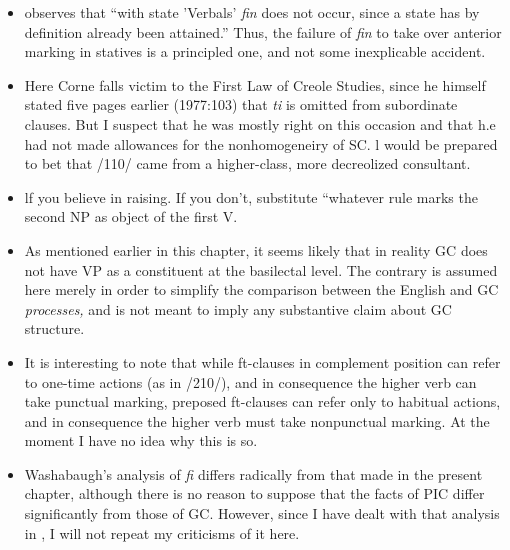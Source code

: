 \begin{itemize}
\begin{itemize}
\begin{itemize}
\begin{itemize}
\begin{itemize}
\begin{itemize}
\begin{itemize}
\item \citet{Corne1981} observes that ``with state 'Verbals' \textit{fin} does not occur, since a state has by definition already been attained.'' Thus, the failure of \textit{fin} to take over anterior marking in statives is a principled one, and not some inexplicable accident.
\item Here Corne falls victim to the First Law of Creole Studies, since he himself stated five pages earlier (1977:103) that \textit{ti} is omitted from subordinate clauses. But I suspect that he was mostly right on this occasion and that h.e had not made allowances for the nonhomogeneiry of SC. l would be prepared to bet that /110/ came from a higher-class, more decreolized consultant.
\item lf you believe in raising. If you don't, substitute ``whatever rule marks the second NP as object of the first V.{\textquotedbl}
\item As mentioned earlier in this chapter, it seems likely that in reality GC does not have VP as a constituent at the basilectal level. The contrary is assumed here merely in order to simplify the com\-parison between the English and GC \textit{processes,} and is not meant to imply any substantive claim about GC structure.
\item It is interesting to note that while ft-clauses in complement position can refer to one-time actions (as in /210/), and in consequence the higher verb can take punctual marking, preposed ft-clauses can refer only to habitual actions, and in consequence the higher verb must take nonpunctual marking. At the moment I have no idea why this is so.
\item Washabaugh's analysis of \textit{fi} differs radically from that made in the present chapter, although there is no reason to suppose that the facts of PIC differ significantly from those of GC. However, since I have dealt with that analysis in \citet{Bickerton1980}, I will not repeat my criticisms of it here.
\end{itemize}





\end{itemize}
\end{itemize}
\end{itemize}
\end{itemize}
\end{itemize}
\end{itemize}
